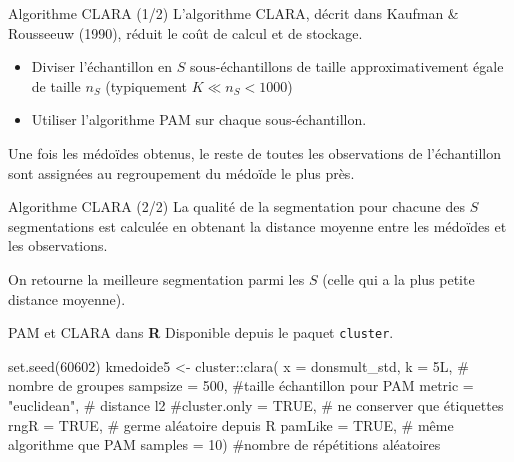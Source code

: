 \documentclass[
  ignorenonframetext,
]{beamer}
\newenvironment{Shaded}{\begin{snugshade}}{\end{snugshade}}
\newcommand{\AttributeTok}[1]{\textcolor[rgb]{0.40,0.45,0.13}{#1}}
\newcommand{\CommentTok}[1]{\textcolor[rgb]{0.37,0.37,0.37}{#1}}
\newcommand{\ConstantTok}[1]{\textcolor[rgb]{0.56,0.35,0.01}{#1}}
\newcommand{\DecValTok}[1]{\textcolor[rgb]{0.68,0.00,0.00}{#1}}
\newcommand{\FunctionTok}[1]{\textcolor[rgb]{0.28,0.35,0.67}{#1}}
\newcommand{\NormalTok}[1]{\textcolor[rgb]{0.00,0.23,0.31}{#1}}
\newcommand{\OtherTok}[1]{\textcolor[rgb]{0.00,0.23,0.31}{#1}}
\newcommand{\SpecialCharTok}[1]{\textcolor[rgb]{0.37,0.37,0.37}{#1}}
\newcommand{\StringTok}[1]{\textcolor[rgb]{0.13,0.47,0.30}{#1}}
\providecommand{\tightlist}{%
  \setlength{\itemsep}{0pt}\setlength{\parskip}{0pt}}\usepackage{longtable,booktabs,array}
\begin{document}
\begin{frame}{Algorithme CLARA (1/2)}
\protect\hypertarget{algorithme-clara-12}{}
L'algorithme CLARA, décrit dans Kaufman \& Rousseeuw (1990), réduit le
coût de calcul et de stockage.

\begin{itemize}
\tightlist
\item
  Diviser l'échantillon en \(S\) sous-échantillons de taille
  approximativement égale de taille \(n_S\) (typiquement
  \(K \ll n_S < 1000\))
\item
  Utiliser l'algorithme PAM sur chaque sous-échantillon.
\end{itemize}

Une fois les médoïdes obtenus, le reste de toutes les observations de
l'échantillon sont assignées au regroupement du médoïde le plus près.
\end{frame}

\begin{frame}{Algorithme CLARA (2/2)}
\protect\hypertarget{algorithme-clara-22}{}
La qualité de la segmentation pour chacune des \(S\) segmentations est
calculée en obtenant la distance moyenne entre les médoïdes et les
observations.

On retourne la meilleure segmentation parmi les \(S\) (celle qui a la
plus petite distance moyenne).
\end{frame}

\begin{frame}[fragile]{PAM et CLARA dans \textbf{R}}
\protect\hypertarget{pam-et-clara-dans-r}{}
Disponible depuis le paquet \texttt{cluster}.

\begin{Shaded}
\begin{Highlighting}[numbers=left,,]
\FunctionTok{set.seed}\NormalTok{(}\DecValTok{60602}\NormalTok{)}
\NormalTok{kmedoide5 }\OtherTok{\textless{}{-}}\NormalTok{ cluster}\SpecialCharTok{::}\FunctionTok{clara}\NormalTok{(}
   \AttributeTok{x =}\NormalTok{ donsmult\_std,}
   \AttributeTok{k =}\NormalTok{ 5L, }\CommentTok{\# nombre de groupes}
   \AttributeTok{sampsize =} \DecValTok{500}\NormalTok{, }\CommentTok{\#taille échantillon pour PAM}
   \AttributeTok{metric =} \StringTok{"euclidean"}\NormalTok{, }\CommentTok{\# distance l2}
   \CommentTok{\#cluster.only = TRUE, \# ne conserver que étiquettes}
   \AttributeTok{rngR =} \ConstantTok{TRUE}\NormalTok{, }\CommentTok{\# germe aléatoire depuis R}
   \AttributeTok{pamLike =} \ConstantTok{TRUE}\NormalTok{, }\CommentTok{\# même algorithme que PAM}
   \AttributeTok{samples =} \DecValTok{10}\NormalTok{) }\CommentTok{\#nombre de répétitions aléatoires}
\end{Highlighting}
\end{Shaded}
\end{frame}
\end{document}
